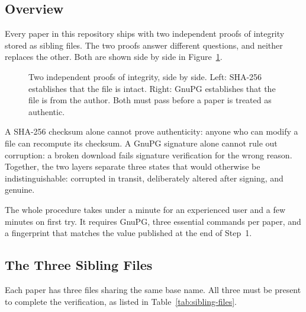 \subsection*{Overview}

Every paper in this repository ships with two independent proofs of
integrity stored as sibling files. The two proofs answer different
questions, and neither replaces the other. Both are shown side by
side in Figure~\ref{fig:two-proofs}.

\begin{figure}[H]
	\centering
	\caption{Two independent proofs of integrity, side by side.
		Left: SHA-256 establishes that the file is intact.
		Right: GnuPG establishes that the file is from the author.
		Both must pass before a paper is treated as authentic.}
	\label{fig:two-proofs}
\end{figure}

A SHA-256 checksum alone cannot prove authenticity: anyone who can
modify a file can recompute its checksum. A GnuPG signature alone
cannot rule out corruption: a broken download fails signature
verification for the wrong reason. Together, the two layers
separate three states that would otherwise be indistinguishable:
corrupted in transit, deliberately altered after signing, and
genuine.

The whole procedure takes under a minute for an experienced user
and a few minutes on first try. It requires GnuPG, three essential
commands per paper, and a fingerprint that matches the value
published at the end of Step~1.

\subsection*{The Three Sibling Files}

Each paper has three files sharing the same base name. All three
must be present to complete the verification, as listed in
Table~\ref{tab:sibling-files}.

